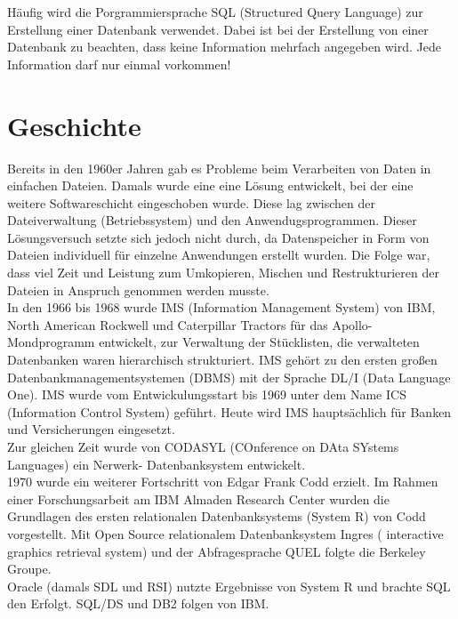 \documentclass[11pt,a4paper]{report}
\begin{document}
Häufig wird die Porgrammiersprache SQL (Structured Query Language) zur Erstellung einer Datenbank verwendet. Dabei ist bei der Erstellung von einer Datenbank zu beachten, dass keine Information mehrfach angegeben wird. Jede Information darf nur einmal vorkommen!

\section{Geschichte}
Bereits in den 1960er Jahren gab es Probleme beim Verarbeiten von Daten in einfachen Dateien. Damals wurde eine eine Lösung entwickelt, bei der eine weitere Softwareschicht eingeschoben wurde. Diese lag zwischen der Dateiverwaltung (Betriebssystem) und den Anwendugsprogrammen. Dieser Lösungsversuch setzte sich jedoch nicht durch, da Datenspeicher in Form von Dateien individuell für einzelne Anwendungen erstellt wurden. Die Folge war, dass viel Zeit und Leistung zum Umkopieren, Mischen und Restrukturieren der Dateien in Anspruch genommen werden musste.\\

In den 1966 bis 1968 wurde IMS (Information Management System) von IBM, North American Rockwell und Caterpillar Tractors für das Apollo-Mondprogramm entwickelt, zur Verwaltung der Stücklisten, die verwalteten Datenbanken waren hierarchisch strukturiert. IMS gehört zu den ersten großen Datenbankmanagementsystemen (DBMS) mit der Sprache DL/I (Data Language One). IMS wurde vom Entwickulungsstart bis 1969 unter dem Name  ICS (Information Control System) geführt. Heute wird IMS hauptsächlich für Banken und Versicherungen eingesetzt.\\

Zur gleichen Zeit wurde von CODASYL (COnference on DAta SYstems Languages) ein Nerwerk- Datenbanksystem entwickelt.\\

1970 wurde ein weiterer Fortschritt von Edgar Frank Codd erzielt. Im Rahmen einer Forschungsarbeit am IBM Almaden Research Center wurden die Grundlagen des ersten relationalen Datenbanksystems (System R) von Codd vorgestellt. Mit Open Source relationalem Datenbanksystem Ingres ( interactive graphics retrieval system) und der Abfragesprache QUEL folgte die Berkeley Groupe.\\

Oracle (damals SDL und RSI) nutzte Ergebnisse von System R und brachte SQL den Erfolgt. SQL/DS und DB2 folgen von IBM.\\
\end{document}
